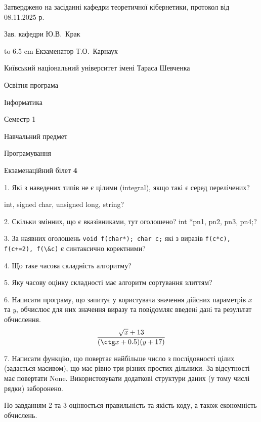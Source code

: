 \documentclass[12pt, ukrainian]{article}
\def\code#1{\Verb!#1!}
\begin{document}
{\smallskip\smallskip \begin {scriptsize} Затверджено на засіданні кафедри теоретичної кібернетики, протокол   від   08.11.2025 р.\par\smallskip\smallskip\smallskip\smallskip
{\parbox {6.5 cm} {Зав. кафедри \dotfill Ю.В.~Крак}}\hspace {0.7cm} {\hbox to 6.5 cm { Екзаменатор \dotfill Т.О.~Карнаух}} \end{scriptsize}}
\vspace{0.9cm}
{{\begin {scriptsize}\par
{ \center  Київський національний університет імені Тараса Шевченка \par}
{\parbox {5 cm}{Освітня програма \hfill}{\parbox {7 cm}{Інформатика\hfill}}\parbox {6 cm}{\hfill Семестр 1}}\par
{\parbox {5 cm} {Навчальний предмет \hfill}\parbox {7 cm}{Програмування \hfill}\parbox {6cm}{\hfill}\par}\vspace{-15pt} \end{scriptsize}}{\center Екзаменаційний білет \No \textbf { 4 }\par}}
{%
1. Які з наведених типів не є цілими (integral), якщо такі є серед перелічених?

int, signed char, unsigned long, string?
\par
\vspace{2mm}
2. Скільки змінних, що є вказівниками, тут оголошено?
int *pn1, pn2, pn3, pn4;?
\par
\vspace{2mm}
3. За наявних оголошень \code{void f(char*); char c;} які з виразів \code{f(c*c), f(c+=2), f(\&c)} є синтаксично коректними?
\par
\vspace{2mm}
4. Що таке часова складність алгоритму?
\par
\vspace{2mm}
5. Яку часову оцінку складності має алгоритм сортування злиттям?
\par
\vspace{2mm}
6. Написати програму, що запитує у користувача значення дійсних параметрів $x$ та $y$, обчислює для них значення виразу та повiдомляє введенi данi та результат обчислення.
$$\frac{\sqrt x + 13}{(\ctg x + 0.5) (y + 17)}$$ 

\par
7. Написати функцію, що повертає найбільше число з послідовності цілих (задається масивом), що має рівно три різних простих дільники. За відсутності має повертати None. Використовувати додаткові структури даних (у тому числі рядки) заборонено.

По завданням 2 та 3 оцінюється правильність та якість коду, а також економність обчислень.

}
\end{document}
